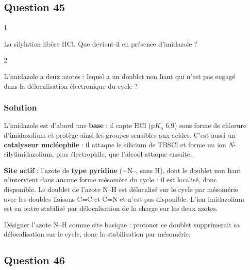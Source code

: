 \documentclass[11pt,a4paper]{article}
\begin{document}
\hypertarget{question-45}{%
\subsection{Question 45}\label{question-45}}

\begin{indication}{1}

La silylation libère HCl. Que devient-il en présence d'imidazole ?

\end{indication}

\begin{indication}{2}

L'imidazole a deux azotes : lequel a un doublet non liant qui n'est pas engagé dans la délocalisation électronique du cycle ?

\end{indication}

\hypertarget{solution-44}{%
\subsubsection{Solution}\label{solution-44}}

L'imidazole est d'abord une \textbf{base} : il capte HCl (p\(K_a\) 6,9) sous forme de chlorure d'imidazolium et protège ainsi les groupes sensibles aux acides. C'est aussi un \textbf{catalyseur nucléophile} : il attaque le silicium de TBSCl et forme un ion \emph{N}-silylimidazolium, plus électrophile, que l'alcool attaque ensuite.

\textbf{Site actif} : l'azote de \textbf{type pyridine} (=N--, sans H), dont le doublet non liant n'intervient dans aucune forme mésomère du cycle : il est localisé, donc disponible. Le doublet de l'azote N--H est délocalisé sur le cycle par mésomérie avec les doubles liaisons C=C et C=N et n'est pas disponible. L'ion imidazolium est en outre stabilisé par délocalisation de la charge sur les deux azotes.

\begin{piege}

Désigner l'azote N--H comme site basique : protoner ce doublet supprimerait sa délocalisation sur le cycle, donc la stabilisation par mésomérie.

\end{piege}

\hypertarget{question-46}{%
\subsection{Question 46}\label{question-46}}
\end{document}
